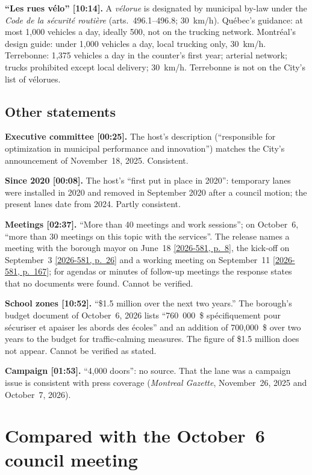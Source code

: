 \documentclass[11pt,letterpaper]{article}
\newcommand{\pagesurl}{https://openmobilitydata.github.io/Terrebonne-access-requests}
\newcommand{\cliptime}[1]{\textsf{\small[#1]}}
\newcommand{\pgl}[2]{\href{\pagesurl/2026-581/raw/01_emails_mandate_counts.pdf\#page=#1}{\textsf{\small[2026-581, p.~#2]}}}
\newcommand{\pg}[1]{\pgl{#1}{#1}}
\begin{document}
\textbf{``Les rues vélo'' \cliptime{10:14}.} A \emph{vélorue} is designated
by municipal by-law under the \emph{Code de la sécurité routière}
(arts.~496.1--496.8; 30~km/h). Québec's guidance: at most 1{,}000 vehicles
a day, ideally 500, not on the trucking network. Montréal's design guide:
under 1{,}000 vehicles a day, local trucking only, 30~km/h. Terrebonne:
1{,}375 vehicles a day in the counter's first year; arterial network;
trucks prohibited except local delivery; 30~km/h. Terrebonne is not on the
City's list of vélorues.

\subsection{Other statements}

\textbf{Executive committee \cliptime{00:25}.} The host's description
(``responsible for optimization in municipal performance and innovation'')
matches the City's announcement of November~18, 2025. Consistent.

\textbf{Since 2020 \cliptime{00:08}.} The host's ``first put in place in
2020'': temporary lanes were installed in 2020 and removed in September
2020 after a council motion; the present lanes date from 2024. Partly
consistent.

\textbf{Meetings \cliptime{02:37}.} ``More than 40 meetings and work
sessions''; on October~6, ``more than 30 meetings on this topic with the
services''. The release names a meeting with the borough mayor on June~18
\pg{8}, the kick-off on September~3 \pg{26} and a working meeting on
September~11 \pg{167}; for agendas or minutes of follow-up meetings the
response states that no documents were found. Cannot be verified.

\textbf{School zones \cliptime{10:52}.} ``\$1.5 million over the next two
years.'' The borough's budget document of October~6, 2026 lists
``760~000~\$ spécifiquement pour sécuriser et apaiser les abords des
écoles'' and an addition of 700{,}000~\$ over two years to the budget for
traffic-calming measures. The figure of \$1.5 million does not appear.
Cannot be verified as stated.

\textbf{Campaign \cliptime{01:53}.} ``4,000 doors'': no source. That the
lane was a campaign issue is consistent with press coverage (\emph{Montreal
Gazette}, November~26, 2025 and October~7, 2026).

\section{Compared with the October~6 council meeting}
\end{document}
